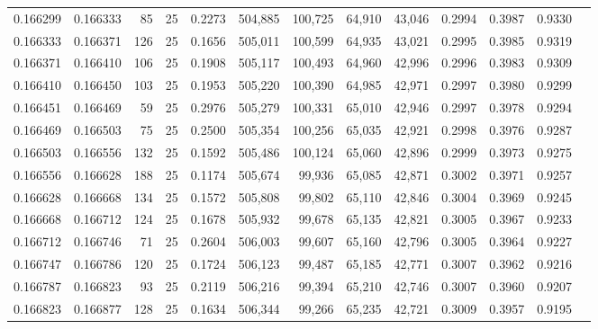\begin{tabular}{rrrrrrrrrrrrr}
0.166299 & 0.166333 &    85 &  25 &                                     0.2273 & 504,885 & 100,725 &  64,910 &  43,046 & 0.2994 & 0.3987 & 0.9330 \\
0.166333 & 0.166371 &   126 &  25 &                                     0.1656 & 505,011 & 100,599 &  64,935 &  43,021 & 0.2995 & 0.3985 & 0.9319 \\
0.166371 & 0.166410 &   106 &  25 &                                     0.1908 & 505,117 & 100,493 &  64,960 &  42,996 & 0.2996 & 0.3983 & 0.9309 \\
0.166410 & 0.166450 &   103 &  25 &                                     0.1953 & 505,220 & 100,390 &  64,985 &  42,971 & 0.2997 & 0.3980 & 0.9299 \\
0.166451 & 0.166469 &    59 &  25 &                                     0.2976 & 505,279 & 100,331 &  65,010 &  42,946 & 0.2997 & 0.3978 & 0.9294 \\
0.166469 & 0.166503 &    75 &  25 &                                     0.2500 & 505,354 & 100,256 &  65,035 &  42,921 & 0.2998 & 0.3976 & 0.9287 \\
0.166503 & 0.166556 &   132 &  25 &                                     0.1592 & 505,486 & 100,124 &  65,060 &  42,896 & 0.2999 & 0.3973 & 0.9275 \\
0.166556 & 0.166628 &   188 &  25 &                                     0.1174 & 505,674 &  99,936 &  65,085 &  42,871 & 0.3002 & 0.3971 & 0.9257 \\
0.166628 & 0.166668 &   134 &  25 &                                     0.1572 & 505,808 &  99,802 &  65,110 &  42,846 & 0.3004 & 0.3969 & 0.9245 \\
0.166668 & 0.166712 &   124 &  25 &                                     0.1678 & 505,932 &  99,678 &  65,135 &  42,821 & 0.3005 & 0.3967 & 0.9233 \\
0.166712 & 0.166746 &    71 &  25 &                                     0.2604 & 506,003 &  99,607 &  65,160 &  42,796 & 0.3005 & 0.3964 & 0.9227 \\
0.166747 & 0.166786 &   120 &  25 &                                     0.1724 & 506,123 &  99,487 &  65,185 &  42,771 & 0.3007 & 0.3962 & 0.9216 \\
0.166787 & 0.166823 &    93 &  25 &                                     0.2119 & 506,216 &  99,394 &  65,210 &  42,746 & 0.3007 & 0.3960 & 0.9207 \\
0.166823 & 0.166877 &   128 &  25 &                                     0.1634 & 506,344 &  99,266 &  65,235 &  42,721 & 0.3009 & 0.3957 & 0.9195 \\

\end{tabular}
